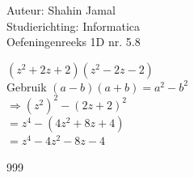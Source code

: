 \documentclass[a4paper]{article}
\begin{document}
  
\noindent \large Auteur: Shahin Jamal \\
\noindent \large Studierichting: Informatica\\
\noindent \large Oefeningenreeks 1D nr. 5.8\\

\medskip

\normalsize

$(z^2 + 2z + 2)(z^2 - 2z - 2)$\\

Gebruik $(a - b)(a + b) = a^2 - b^2$\\

$\Rightarrow (z^2)^2 - (2z + 2)^2$\\

$= z^4 - (4z^2 + 8z + 4)$\\

$= z^4 - 4z^2 - 8z - 4$\\

\begin{thebibliography}{999}
\end{thebibliography}
\end{document}

